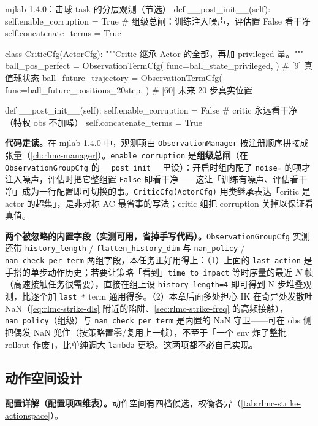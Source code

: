 \begin{codebox}[Python]{mjlab 1.4.0：击球 task 的分层观测（节选）}
        def __post_init__(self):
            self.enable_corruption = True     # 组级总闸：训练注入噪声，评估置 False 看干净
            self.concatenate_terms = True

    class CriticCfg(ActorCfg):
        """Critic 继承 Actor 的全部，再加 privileged 量。"""
        ball_pos_perfect = ObservationTermCfg(
            func=ball_state_privileged,
        )                                     # [9] 真值球状态
        ball_future_trajectory = ObservationTermCfg(
            func=ball_future_positions_20step,
        )                                     # [60] 未来 20 步真实位置

        def __post_init__(self):
            self.enable_corruption = False    # critic 永远看干净（特权 obs 不加噪）
            self.concatenate_terms = True
\end{codebox}

\textbf{代码走读。}在 mjlab 1.4.0 中，观测项由 \verb|ObservationManager| 按注册顺序拼接成张量（\cref{ch:rlmc-manager}）。\verb|enable_corruption| 是\textbf{组级总闸}（在 \verb|ObservationGroupCfg| 的 \verb|__post_init__| 里设）：开启时组内配了 \verb|noise=| 的项才注入噪声，评估时把它整组置 \verb|False| 即看干净——这让「训练有噪声、评估看干净」成为一行配置即可切换的事。\verb|CriticCfg(ActorCfg)| 用类继承表达「critic 是 actor 的超集」，是非对称 AC 最省事的写法；critic 组把 corruption 关掉以保证看真值。

\textbf{两个被忽略的内置字段（实测可用，省掉手写代码）。}\verb|ObservationGroupCfg| 实测还带 \verb|history_length| / \verb|flatten_history_dim| 与 \verb|nan_policy| / \verb|nan_check_per_term| 两组字段，本任务正好用得上：（1）上面的 \verb|last_action| 是手搭的单步动作历史；若要让策略「看到」\verb|time_to_impact| 等时序量的最近 $N$ 帧（高速接触任务很需要），直接在组上设 \verb|history_length=4| 即可得到 N 步堆叠观测，比逐个加 \verb|last_*| term 通用得多。（2）本章后面多处担心 IK 在奇异处发散吐 NaN（\cref{eq:rlmc-strike-dls} 附近的陷阱、\cref{sec:rlmc-strike-freq} 的高频接触），\verb|nan_policy|（组级）与 \verb|nan_check_per_term| 是内置的 NaN 守卫——可在 obs 侧把偶发 NaN 兜住（按策略置零/复用上一帧），不至于「一个 env 炸了整批 rollout 作废」，比单纯调大 \verb|lambda| 更稳。这两项都不必自己实现。

\subsection{动作空间设计}

\textbf{配置详解（配置项四维表）。}动作空间有四档候选，权衡各异（\cref{tab:rlmc-strike-actionspace}）。

